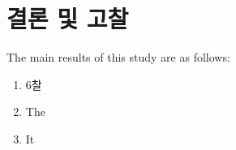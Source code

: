\newpage

\section{결론 및 고찰}
The main results of this study are as follows:
\begin{enumerate}
	\item 6찰
	\item The 
	\item It 
\end{enumerate}